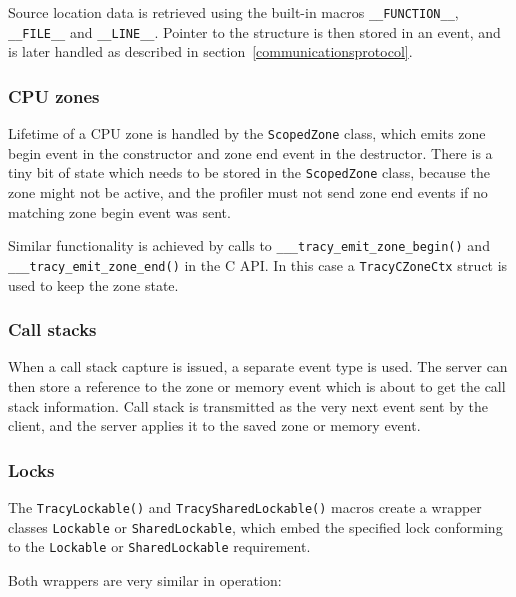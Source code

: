 \documentclass[hidelinks,titlepage,a4paper]{article}
\begin{document}
Source location data is retrieved using the built-in macros \texttt{\_\_FUNCTION\_\_}, \texttt{\_\_FILE\_\_} and \texttt{\_\_LINE\_\_}. Pointer to the structure is then stored in an event, and is later handled as described in section~\ref{communicationsprotocol}.

\subsubsection{CPU zones}
\label{cpuzones}

Lifetime of a CPU zone is handled by the \texttt{ScopedZone} class, which emits zone begin event in the constructor and zone end event in the destructor. There is a tiny bit of state which needs to be stored in the \texttt{ScopedZone} class, because the zone might not be active, and the profiler must not send zone end events if no matching zone begin event was sent.

Similar functionality is achieved by calls to \texttt{\_\_\_tracy\_emit\_zone\_begin()} and \texttt{\_\_\_tracy\_emit\_zone\_end()} in the C API. In this case a \texttt{TracyCZoneCtx} struct is used to keep the zone state.

\subsubsection{Call stacks}

When a call stack capture is issued, a separate event type is used. The server can then store a reference to the zone or memory event which is about to get the call stack information. Call stack is transmitted as the very next event sent by the client, and the server applies it to the saved zone or memory event.

\subsubsection{Locks}

The \texttt{TracyLockable()} and \texttt{TracySharedLockable()} macros create a wrapper classes \texttt{Lockable} or \texttt{SharedLockable}, which embed the specified lock conforming to the \texttt{Lockable} or \texttt{SharedLockable} requirement.

Both wrappers are very similar in operation:
\end{document}
